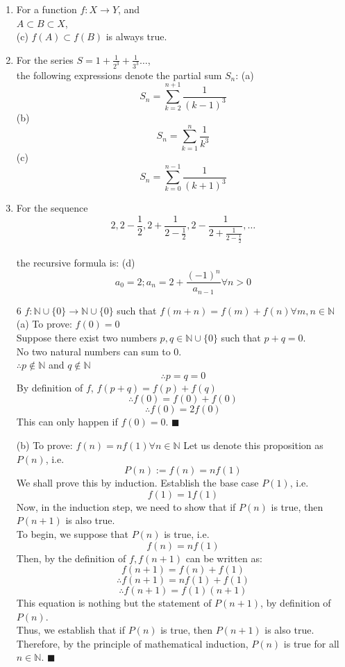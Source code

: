 \documentclass[a4paper,12pt]{article} %
\begin{document}
\begin{enumerate}

\item For a function \(f: X \rightarrow Y \), and \\
	\(A \subset B \subset X \), \\
	(c) \(f(A) \subset f(B)\) is always true.

\item For the series \(S = 1 + \frac{1}{2^3} + \frac{1}{3^3} \dots \),\\
	the following expressions denote the partial sum \(S_n\):
	\subitem (a) \[S_n = \sum_{k=2}^{n + 1} \frac{1}{(k - 1)^3}\]
	\subitem (b) \[S_n = \sum_{k=1}^{n} \frac{1}{k^3}\]
	\subitem (c) \[S_n = \sum_{k=0}^{n - 1} \frac{1}{(k + 1)^3}\]

\item For the sequence
	\[ 2, 2-\frac{1}{2}, 2 + \frac{1}{2-\frac{1}{2}}, 2 - \frac{1}{2 + \frac{1}{2-\frac{1}{2}}}, \dots \]\\
	the recursive formula is:
	\subitem (d) \[ a_0 = 2; a_n = 2 + \frac{(-1)^n}{a_{n - 1}} \forall n > 0 \]

\item[6] \(f : \mathbb{N} \cup \{0\} \rightarrow \mathbb{N} \cup \{0\} \) such that \(f(m + n) = f(m) + f(n) \forall m, n \in \mathbb{N} \)
	\subitem(a) To prove: \(f(0) = 0\)\\
	Suppose there exist two numbers \(p, q \in \mathbb{N} \cup \{0\}\) such that \(p + q = 0\).\\
	No two natural numbers can sum to 0.\\
		\( \therefore p \notin \mathbb{N} \) and \(q \notin \mathbb{N}\)\\
		\[\therefore p = q = 0\]
	By definition of \(f\), \(f(p + q) = f(p) + f(q)\)
	\[\therefore f(0) = f(0) + f(0)\]
	\[\therefore f(0) = 2f(0)\]
	This can only happen if \(f(0) = 0\). $ \blacksquare $

	\subitem(b) To prove: \(f(n) = nf(1) \forall n \in \mathbb{N}\)
	Let us denote this proposition as \(P(n)\), i.e.
		\[P(n) := f(n) = nf(1)\]
	We shall prove this by induction.
	Establish the base case \(P(1)\), i.e.
		\[f(1) = 1f(1)\]
	Now, in the induction step, we need to show that if \(P(n)\) is true, then \(P(n + 1)\) is also true.\\
	To begin, we suppose that \(P(n)\) is true, i.e.
		\[f(n) = nf(1)\]
	Then, by the definition of \(f, f(n + 1)\) can be written as:
		\[f(n + 1) = f(n) + f(1)\]
		\[ \therefore f(n + 1) = nf(1) + f(1)\]
		\[\therefore f(n + 1) = f(1)(n + 1)\]
	This equation is nothing but the statement of $P(n + 1)$, by definition of $P(n)$.\\
	Thus, we establish that if $P(n)$ is true, then $P(n + 1)$ is also true.\\
	Therefore, by the principle of mathematical induction, $P(n)$ is true for all $n \in \mathbb{N}$. $ \blacksquare $



\end{enumerate}
\end{document}
